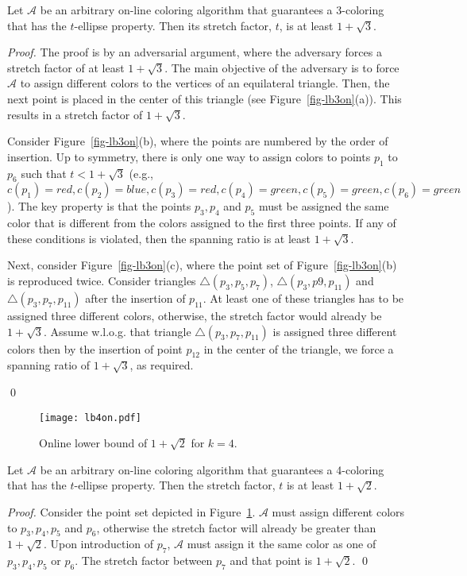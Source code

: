 \documentclass[pdftex,leqno,fleqn,12pts]{llncs}
\begin{document}
\begin{lemma} 
Let $\mathcal{A}$ be an arbitrary on-line coloring algorithm
that guarantees a 3-coloring that has the $t$-ellipse property. Then
its stretch factor, $t$, is at least $1+\sqrt{3}$.
\end{lemma}
\begin{proof}
The proof is by an adversarial argument, where the adversary forces 
a stretch factor of at least $1+\sqrt{3}$. The main objective of the 
adversary is to force $\mathcal{A}$ to assign different colors to 
the vertices of an equilateral triangle. Then, the next point is 
placed in the center of this triangle (see Figure~\ref{fig-lb3on}(a)). 
This results in a stretch factor of $1+\sqrt{3}$.

Consider Figure~\ref{fig-lb3on}(b), where the points are numbered by 
the order of insertion. Up to symmetry, there is only one way to 
assign colors to points $p_1$ to $p_6$ such that $t<1+\sqrt{3}$ 
(e.g., $c(p_1)=red, c(p_2)=blue, c(p_3)=red, c(p_4)=green, c(p_5)=green, c(p_6)=green$).
The key property is that the points $p_3, p_4$ and $p_5$ must be assigned the same color that is different from the colors assigned 
to the first three points. If any of these conditions is violated, then the spanning ratio is at least $1 + \sqrt{3}$.

Next, consider Figure~\ref{fig-lb3on}(c), where the point set of
Figure~\ref{fig-lb3on}(b) is reproduced twice. 
Consider triangles $\triangle(p_3,p_5,p_7)$, $\triangle(p_3,p9,p_{11})$ and 
$\triangle(p_3,p_7,p_{11})$ after the insertion of 
$p_{11}$.
At least one of these triangles has to be assigned three different 
colors, otherwise, the stretch factor would already be $1+\sqrt{3}$.
Assume w.l.o.g. that triangle $\triangle(p_3,p_7,p_{11})$ is assigned three
different colors then by the insertion of point $p_{12}$ in the center of the
triangle, we force a spanning ratio of $1 + \sqrt{3}$, as required. 

\qed 
\end{proof}

\begin{figure}
\centering\texttt{[image: lb4on.pdf]}\caption{Online lower bound of
$1+\sqrt{2}$ for $k=4$.}\label{fig-lb4on}
\end{figure}

\begin{lemma} 
Let $\mathcal{A}$ be an arbitrary on-line coloring algorithm
that guarantees a 4-coloring that has the $t$-ellipse property. Then
the stretch factor, $t$ is at least $1+\sqrt{2}$.
\end{lemma}
\begin{proof} 
Consider the point set depicted in Figure~\ref{fig-lb4on}.
$\mathcal{A}$ must assign different colors to $p_3,p_4,p_5$ and $p_6$, otherwise the stretch factor will already be greater than $1+\sqrt{2}$. 
Upon introduction 
of $p_7$, $\mathcal{A}$ must assign it the same color as one of $p_3,p_4,p_5$ or $p_6$. The stretch factor between $p_7$ and that 
point is $1+\sqrt{2}$. 
\qed 
\end{proof}
\end{document}
